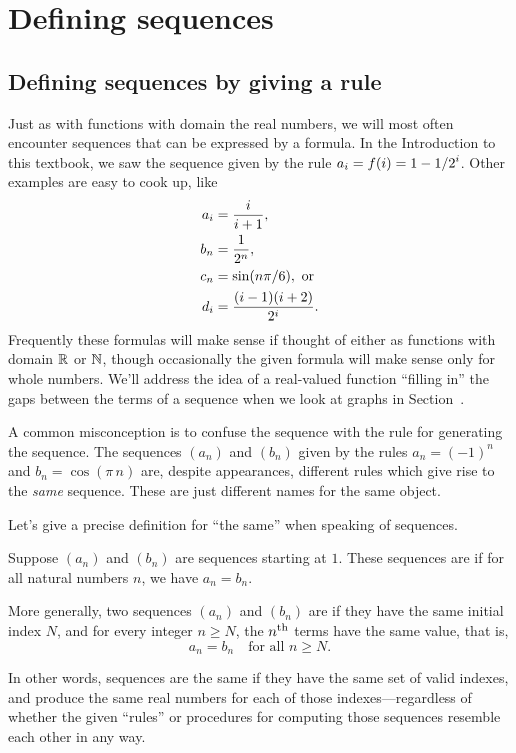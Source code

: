 \section{Defining sequences}

\subsection{Defining sequences by giving a rule}

Just as with functions with domain the real numbers, we will most
often encounter sequences that can be expressed by a formula.  In the
Introduction to this textbook, we saw the sequence given by the rule $\displaystyle
a_i=f(i)=1-1/2^i$.  Other examples are easy to cook up, like
\begin{align*}
  a_i &={i\over i+1}, \\
  b_n &={1\over2^n}, \\
  c_n &=\sin(n\pi/6), \mbox{ or} \\
  d_i &={(i-1)(i+2)\over2^i}. \\
\end{align*}
Frequently these formulas will make sense if thought of either as
functions with domain $\mathbb{R}$ or $\mathbb{N}$, though occasionally the given
formula will make sense only for whole numbers.  We'll address the
idea of a real-valued function ``filling in'' the gaps between the
terms of a sequence when we look at graphs in
Section~.

\begin{warning}
  A common misconception is to confuse the sequence with the rule for
  generating the sequence.  The sequences $(a_n)$ and $(b_n)$ given by
  the rules $a_n = (-1)^n$ and $b_n = \cos (\pi \, n)$ are, despite
  appearances, different rules which give rise to the \textit{same}
  sequence.  These are just different names for the same object.
\end{warning}

Let's give a precise definition for ``the same'' when speaking of sequences.


\begin{definition}
  Suppose $(a_n)$ and $(b_n)$ are sequences starting at $1$.  These
  sequences are  if for all
  natural numbers $n$, we have $a_n = b_n$.

  More generally, two sequences $(a_n)$ and $(b_n)$ are
   if they have the same initial index $N$, and for
  every integer $n \geq N$, the $n^{\mbox{\scriptsize th}}$ terms have the same value, that is,
  \[
  a_n = b_n \quad \mbox{for all $n \geq N$.}
  \]
\end{definition}
In other words, sequences are the same if they have the same set of
valid indexes, and produce the same real numbers for each of those
indexes---regardless of whether the given ``rules'' or procedures for
computing those sequences resemble each other in any way.

